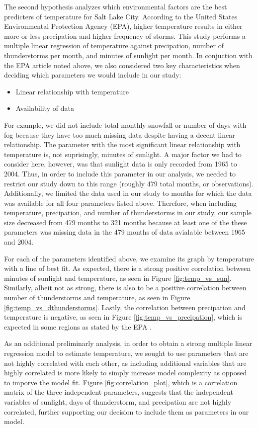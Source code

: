 The second hypothesis analyzes which environmental factors are the best predicters of temperature for Salt Lake City. According to the United States Environmental Protection Agency (EPA), higher temperature results in either more or less precipation and higher frequency of storms\cite{epa_utah}. This study performs a multiple linear regression of temperature against precipation, number of thunderstorms per month, and minutes of sunlight per month. In conjuction with the EPA article noted above, we also considered two key characteristics when deciding which parameters we would include in our study: 

\begin{itemize}
	\item Linear relationship with temperature
	\item Availability of data
\end{itemize}

For example, we did not include total monthly snowfall or number of days with fog because they have too much missing data despite having a decent linear relationship. The parameter with the most significant linear relationship with temperature is, not suprisingly, minutes of sunlight. A major factor we had to consider here, however, was that sunlight data is only recorded from 1965 to 2004. Thus, in order to include this parameter in our analysis, we needed to restrict our study down to this range (roughly 479 total months, or observations). Additionally, we limited the data used in our study to months for which the data was available for all four parameters listed above. Therefore, when including temperature, precipation, and number of thunderstorms in our study, our sample size decreased from 479 months to 321 months because at least one of the these parameters was missing data in the 479 months of data avialable between 1965 and 2004.

For each of the parameters identified above, we examine its graph by temperature with a line of best fit. As expected, there is a strong positive correlation between minutes of sunlight and temperature, as seen in Figure \ref{fig:temp_vs_sun}. Similarly, albeit not as strong, there is also to be a positive correlation between number of thunderstorms and temperature, as seen in Figure \ref{fig:temp_vs_dthunderstorms}. Lastly, the correlation between precipation and temperature is negative, as seen in Figure \ref{fig:temp_vs_precipation}, which is expected in some regions as stated by the EPA \cite{epa_utah}.

As an additional preliminarly analysis, in order to obtain a strong multiple linear regression model to estimate temperature, we sought to use parameters that are not highly correlated with each other, as including additional variables that are highly correlated is more likely to simply increase model complexity as opposed to imporve the model fit. Figure \ref{fig:correlation_plot}, which is a correlation matrix of the three independent parameters, suggests that the independent variables of sunlight, days of thunderstorm, and precipation are not highly correlated, further supporting our decision to include them as parameters in our model.

